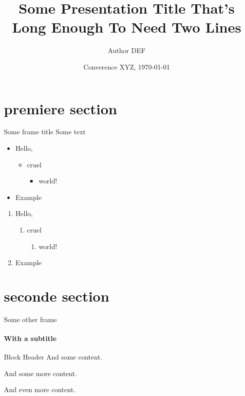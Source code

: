 \documentclass[t]{beamer}
\title{Some Presentation Title That's Long Enough To Need Two Lines}
\date[\today]{Converence XYZ, \today}
\author[Insert author]{Author DEF}
\begin{document}
\begin{frame}
\titlepage
\end{frame}

\begin{refsection}
\section{premiere section} 


\begin{frame}{Some frame title}
Some text   
\begin{itemize}
  \item Hello,
    \begin{itemize}
      \item cruel
        \begin{itemize}
          \item world!
        \end{itemize}
    \end{itemize}
    \item Example
\end{itemize}


\begin{enumerate}
  \item Hello,
    \begin{enumerate}
      \item cruel
        \begin{enumerate}
          \item world!
        \end{enumerate}
    \end{enumerate}
  \item Example
\end{enumerate}

\end{frame}

\section{seconde section}


\begin{frame}{Some other frame}
\framesubtitle{With a subtitle}
\begin{block}{Block Header}
And some content.

And some more content.

And even more content.


\end{block}
\end{frame}
\end{refsection}
\end{document}
